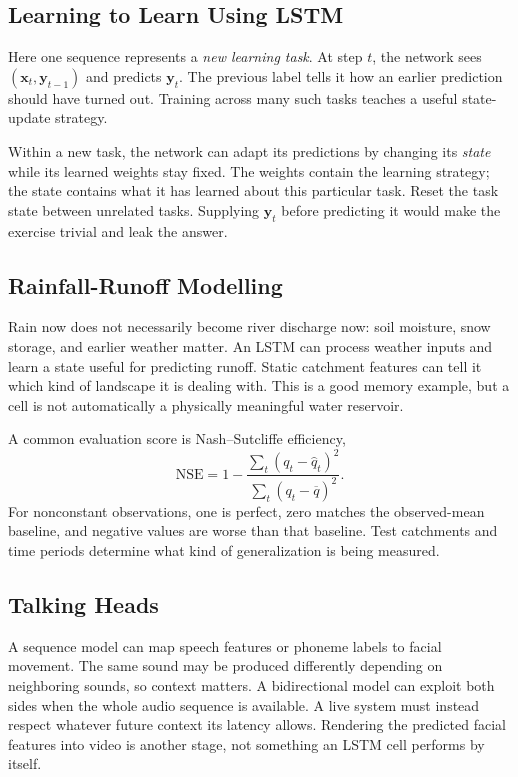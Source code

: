 \documentclass[11pt, oneside]{book}
\let\originalsubsection\subsection
\renewcommand{\subsection}{\Needspace{6\baselineskip}\originalsubsection}
\begin{document}
\subsection{Learning to Learn Using LSTM}\label{sec:source-3-5-4}
Here one sequence represents a \emph{new learning task}. At step $t$, the network sees $(\mathbf{x}_t,\mathbf{y}_{t-1})$ and predicts $\mathbf{y}_t$. The previous label tells it how an earlier prediction should have turned out. Training across many such tasks teaches a useful state-update strategy.

Within a new task, the network can adapt its predictions by changing its \emph{state} while its learned weights stay fixed. The weights contain the learning strategy; the state contains what it has learned about this particular task. Reset the task state between unrelated tasks. Supplying $\mathbf{y}_t$ before predicting it would make the exercise trivial and leak the answer.

\subsection{Rainfall-Runoff Modelling}\label{sec:source-3-5-5}
Rain now does not necessarily become river discharge now: soil moisture, snow storage, and earlier weather matter. An LSTM can process weather inputs and learn a state useful for predicting runoff. Static catchment features can tell it which kind of landscape it is dealing with. This is a good memory example, but a cell is not automatically a physically meaningful water reservoir.

A common evaluation score is Nash--Sutcliffe efficiency,
\[
 \mathrm{NSE}=1-\frac{\sum_t(q_t-\widehat q_t)^2}
                         {\sum_t(q_t-\overline q)^2}.
\]
For nonconstant observations, one is perfect, zero matches the observed-mean baseline, and negative values are worse than that baseline. Test catchments and time periods determine what kind of generalization is being measured.

\subsection{Talking Heads}\label{sec:source-3-5-6}
A sequence model can map speech features or phoneme labels to facial movement. The same sound may be produced differently depending on neighboring sounds, so context matters. A bidirectional model can exploit both sides when the whole audio sequence is available. A live system must instead respect whatever future context its latency allows. Rendering the predicted facial features into video is another stage, not something an LSTM cell performs by itself.
\end{document}
